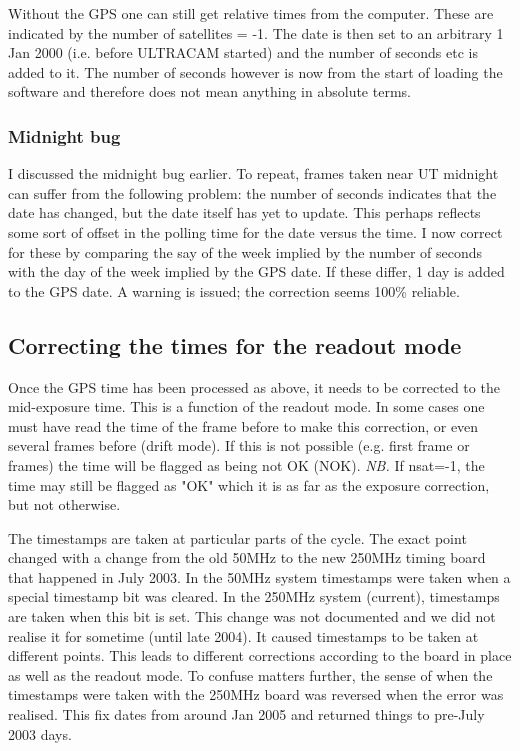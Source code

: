 \documentclass[10pt,a4paper,twocolumn]{article}
\begin{document}
Without the GPS one can still get relative times from the
computer. These are indicated by the number of satellites = -1. The
date is then set to an arbitrary 1 Jan 2000 (i.e. before ULTRACAM
started) and the number of seconds etc is added to it. The number of
seconds however is now from the start of loading the software and
therefore does not mean anything in absolute terms.

\subsubsection{Midnight bug}

I discussed the midnight bug earlier. To repeat, frames taken near UT
midnight can suffer from the following problem: the number of seconds
indicates that the date has changed, but the date itself has yet to
update. This perhaps reflects some sort of offset in the polling time
for the date versus the time. I now correct for these by comparing the
say of the week implied by the number of seconds with the day of the
week implied by the GPS date. If these differ, 1 day is added to the
GPS date. A warning is issued; the correction seems 100\% reliable.


\subsection{Correcting the times for the readout mode}

Once the GPS time has been processed as above, it needs to be corrected to the mid-exposure
time. This is a function of the readout mode. In some cases one must have read the time of the
frame before to make this correction, or even several frames before (drift mode). If this is not possible
(e.g. first frame or frames) the time will be flagged as being not OK (NOK). 
\emph{NB.} If nsat=-1, the time may still be flagged as "OK" which it is as far as the
exposure correction, but not otherwise.

The timestamps are taken at particular parts of the cycle. The exact
point changed with a change from the old 50MHz to the new 250MHz
timing board that happened in July 2003. In the 50MHz system
timestamps were taken when a special timestamp bit was cleared. In the
250MHz system (current), timestamps are taken when this bit is
set. This change was not documented and we did not realise it for
sometime (until late 2004). It caused timestamps to be taken at
different points. This leads to different corrections according to the
board in place as well as the readout mode. To confuse matters
further, the sense of when the timestamps were taken with the 250MHz
board was reversed when the error was realised. This fix dates from
around Jan 2005 and returned things to pre-July 2003 days.
\end{document}
